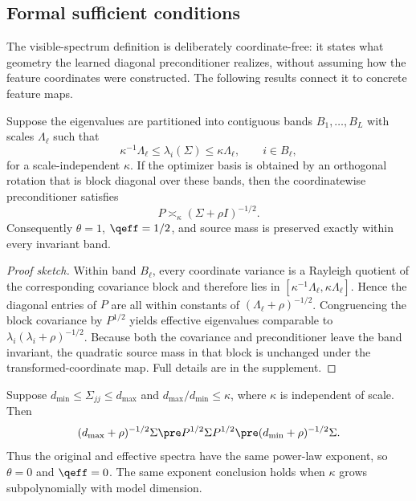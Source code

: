 
\subsection{Formal sufficient conditions}

The visible-spectrum definition is deliberately coordinate-free: it states what geometry the learned diagonal preconditioner realizes, without assuming how the feature coordinates were constructed.  The following results connect it to concrete feature maps.

\begin{proposition}
\label{prop:band-visibility}
Suppose the eigenvalues are partitioned into contiguous bands $B_1,\ldots,B_L$ with scales $\Lambda_\ell$ such that
\[
 \kappa^{-1}\Lambda_\ell\le\lambda_i(\Sigma)\le\kappa\Lambda_\ell,
 \qquad i\in B_\ell,
\]
for a scale-independent $\kappa$.  If the optimizer basis is obtained by an orthogonal rotation that is block diagonal over these bands, then the coordinatewise preconditioner satisfies
\[
 P\asymp_\kappa(\Sigma+\rho I)^{-1/2}.
\]
Consequently $\theta=1$, $\qeff=1/2$, and source mass is preserved exactly within every invariant band.
\end{proposition}

\begin{proof}[Proof sketch]
Within band $B_\ell$, every coordinate variance is a Rayleigh quotient of the corresponding covariance block and therefore lies in $[\kappa^{-1}\Lambda_\ell,\kappa\Lambda_\ell]$.  Hence the diagonal entries of $P$ are all within constants of $(\Lambda_\ell+\rho)^{-1/2}$.  Congruencing the block covariance by $P^{1/2}$ yields effective eigenvalues comparable to $\lambda_i(\lambda_i+\rho)^{-1/2}$.  Because both the covariance and preconditioner leave the band invariant, the quadratic source mass in that block is unchanged under the transformed-coordinate map.  Full details are in the supplement.
\end{proof}

\begin{proposition}
\label{prop:flat-visibility}
Suppose $d_{\min}\le\Sigma_{jj}\le d_{\max}$ and $d_{\max}/d_{\min}\le\kappa$, where $\kappa$ is independent of scale.  Then
\[
 (d_{\max}+\rho)^{-1/2}\Sigma
 \pre P^{1/2}\Sigma P^{1/2}
 \pre(d_{\min}+\rho)^{-1/2}\Sigma.
\]
Thus the original and effective spectra have the same power-law exponent, so $\theta=0$ and $\qeff=0$.  The same exponent conclusion holds when $\kappa$ grows subpolynomially with model dimension.
\end{proposition}

